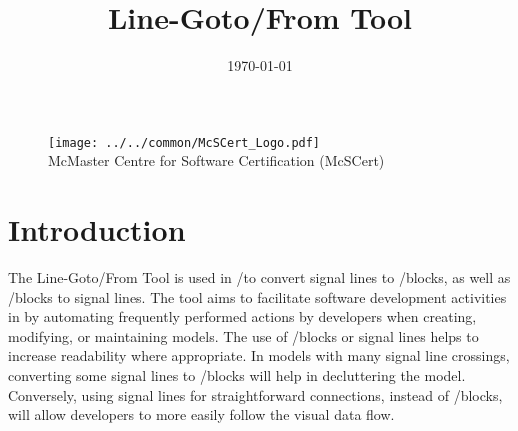 \documentclass{article}
\makeatletter
\newcommand{\ToolName}{Line-Goto/From Tool\@\xspace}
\makeatother
\begin{document}
\title{\ToolName}
\date{\monthyeardate\today}
\maketitle
\vfill

\begin{figure}
	\centering
	\texttt{[image: ../../common/McSCert\_Logo.pdf]} \\
	McMaster Centre for Software Certification (McSCert)
\end{figure}

\newpage


\tableofcontents
\newpage

\section{Introduction}

The \ToolName is used in \Matlab/\Simulink to convert signal lines to \goto/\from blocks, as well as \goto/\from blocks to signal lines. 
The tool aims to facilitate software development activities in \Matlab \Simulink by automating frequently performed actions by developers when creating, modifying, or maintaining models. The use of \goto/\from blocks or signal lines helps to increase readability where appropriate. In models with many signal line crossings, converting some signal lines to \goto/\from blocks will help in decluttering the model. Conversely, using signal lines for straightforward connections, instead of \goto/\from blocks, will allow developers to more easily  follow the visual data flow.

%
	
\end{document}
